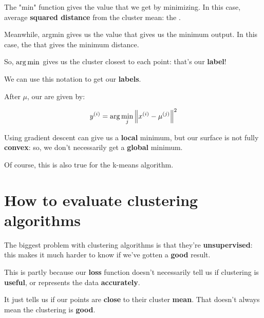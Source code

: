         The "min" function gives the  value that we get by minimizing. In this case, average \textbf{squared distance} from the cluster mean: the .
        
        Meanwhile, argmin gives us the  value that gives us the minimum output. In this case, the  that gives the minimum distance. 
        
        So, ${\rm arg}\min_{}$ gives us the cluster closest to each point: that's our \textbf{label}!
        
        We can use this notation to get our \textbf{labels}.\\
        
        \begin{notation}
            After  $\mu$, our  are given by:
            
            \begin{equation*}
                y^{(i)} = \arg\min_j \left\lVert x^{(i)} - \mu^{(j)} \right\rVert^2
            \end{equation*}
        \end{notation}
        
        Using gradient descent can give us a \textbf{local} minimum, but our surface is not fully \textbf{convex}: so, we don't necessarily get a \textbf{global} minimum.

        Of course, this is also true for the k-means algorithm.

\pagebreak

\section{How to evaluate clustering algorithms}

    The biggest problem with clustering algorithms is that they're \textbf{unsupervised}: this makes it much harder to know if we've gotten a \textbf{good} result.
    
    This is partly because our \textbf{loss} function doesn't necessarily tell us if clustering is \textbf{useful}, or represents the data \textbf{accurately}.
    
    It just tells us if our points are \textbf{close} to their cluster \textbf{mean}. That doesn't always mean the clustering is \textbf{good}.
    

